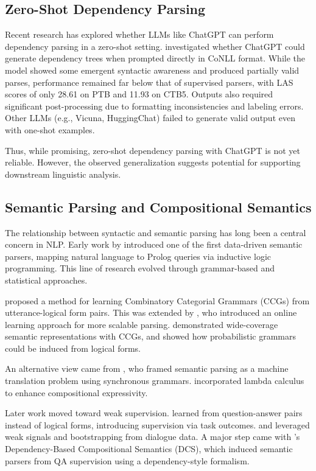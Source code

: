 \subsection{Zero-Shot Dependency Parsing}

Recent research has explored whether LLMs like ChatGPT can perform dependency parsing in a zero-shot setting. \citet{lin2023chatgpt} investigated whether ChatGPT could generate dependency trees when prompted directly in CoNLL format. While the model showed some emergent syntactic awareness and produced partially valid parses, performance remained far below that of supervised parsers, with LAS scores of only 28.61 on PTB and 11.93 on CTB5. Outputs also required significant post-processing due to formatting inconsistencies and labeling errors. Other LLMs (e.g., Vicuna, HuggingChat) failed to generate valid output even with one-shot examples.

Thus, while promising, zero-shot dependency parsing with ChatGPT is not yet reliable. However, the observed generalization suggests potential for supporting downstream linguistic analysis.

\subsection{Semantic Parsing and Compositional Semantics}

The relationship between syntactic and semantic parsing has long been a central concern in NLP. Early work by \citet{zelle1996} introduced one of the first data-driven semantic parsers, mapping natural language to Prolog queries via inductive logic programming. This line of research evolved through grammar-based and statistical approaches.

\citet{zettlemoyer2005} proposed a method for learning Combinatory Categorial Grammars (CCGs) from utterance-logical form pairs. This was extended by \citet{zettlemoyer2007online}, who introduced an online learning approach for more scalable parsing. \citet{bos2004} demonstrated wide-coverage semantic representations with CCGs, and \citet{kwiatkowski2010} showed how probabilistic grammars could be induced from logical forms.

An alternative view came from \citet{wong2006learning}, who framed semantic parsing as a machine translation problem using synchronous grammars. \citet{wong2007} incorporated lambda calculus to enhance compositional expressivity.

Later work moved toward weak supervision. \citet{clarke2010} learned from question-answer pairs instead of logical forms, introducing supervision via task outcomes. \citet{goldwasser2011confidence} and \citet{artzi2011} leveraged weak signals and bootstrapping from dialogue data. A major step came with \citet{liang2013learning}'s Dependency-Based Compositional Semantics (DCS), which induced semantic parsers from QA supervision using a dependency-style formalism.

